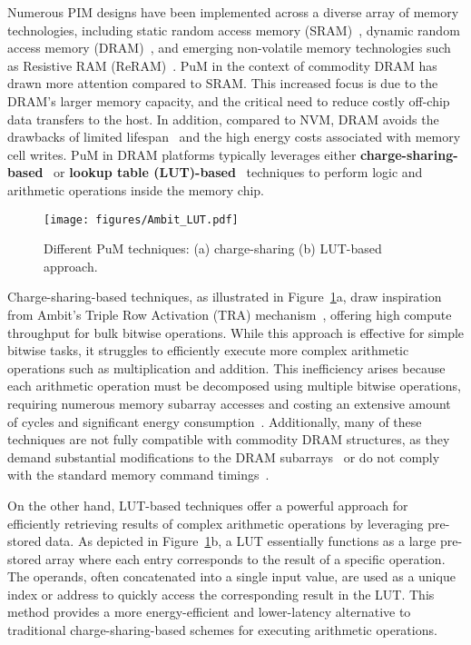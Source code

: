 Numerous PIM designs have been implemented across a diverse array of memory technologies, including static random access memory (SRAM)~\cite{neuralcache}, dynamic random access memory (DRAM)~\cite{drisa, lacc}, and emerging non-volatile memory technologies such as Resistive RAM (ReRAM)~\cite{ReDY}. PuM in the context of commodity DRAM has drawn more attention compared to SRAM. This increased focus is due to the DRAM's larger memory capacity, and the critical need to reduce costly off-chip data transfers to the host. In addition, compared to NVM, DRAM avoids the drawbacks of limited lifespan~\cite{renew} and the high energy costs associated with memory cell writes. PuM in DRAM platforms typically leverages either \textbf{charge-sharing-based}~\cite{ambit} or \textbf{lookup table (LUT)-based}~\cite{pluto} techniques to perform logic and arithmetic operations inside the memory chip.

\begin{figure}[t!]
\centering
\texttt{[image: figures/Ambit\_LUT.pdf]}
\caption{Different PuM techniques: (a) charge-sharing (b) LUT-based approach.}
\label{fig:charge_shared_vs_lut}
\end{figure}

Charge-sharing-based techniques, as illustrated in Figure~\ref{fig:charge_shared_vs_lut}a, draw inspiration from Ambit’s Triple Row Activation (TRA) mechanism~\cite{ambit}, offering high compute throughput for bulk bitwise operations. While this approach is effective for simple bitwise tasks, it struggles to efficiently execute more complex arithmetic operations such as multiplication and addition. This inefficiency arises because each arithmetic operation must be decomposed using multiple bitwise operations, requiring numerous memory subarray accesses and costing an extensive amount of cycles and significant energy consumption~\cite{fulcrum}. Additionally, many of these techniques are not fully compatible with commodity DRAM structures, as they demand substantial modifications to the DRAM subarrays~\cite{drisa, dracc} or do not comply with the standard memory command timings~\cite{computedram}.

On the other hand, LUT-based techniques offer a powerful approach for efficiently retrieving results of complex arithmetic operations by leveraging pre-stored data. As depicted in Figure~\ref{fig:charge_shared_vs_lut}b, a LUT essentially functions as a large pre-stored array where each entry corresponds to the result of a specific operation. The operands, often concatenated into a single input value, are used as a unique index or address to quickly access the corresponding result in the LUT. This method provides a more energy-efficient and lower-latency alternative to traditional charge-sharing-based schemes for executing arithmetic operations.

